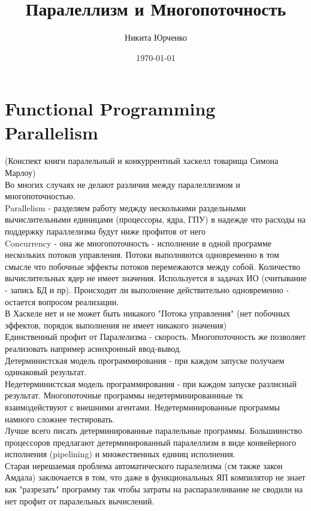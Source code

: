 \documentclass[12pt,a4paper]{article}
\date{\today}
\author{Никита Юрченко}
\title{Паралеллизм и Многопоточность}
\begin{document}
\maketitle
\newpage
{}  

\section{Functional Programming Parallelism}
(Конспект книги паралельный и конкуррентный хаскелл товарища Симона Марлоу)\\
Во многих случаях не делают различия между паралеллизмом и многопоточностью.\\
Parallelism - разделяем работу меджду несколькими раздельными вычислительными единицами (процессоры, ядра, ГПУ) в надежде что расходы на поддержку параллелизма будут ниже профитов от него\\
Concurrency - она же многопоточность - исполнение в одной программе нескольких потоков управления. Потоки выполняются одновременно в том смысле что побочные эффекты потоков перемежаются между собой. Количество вычислительных ядер не имеет значения. Используется в задачах ИО (считывание - запись БД и пр). Происходит ли выполнение действительно одновременно - остается вопросом реализации.\\
В Хаскеле нет и не может быть никакого "Потока управления" (нет побочных эффектов, порядок выполнения не имеет никакого значения)\\
Единственный профит от Паралелизма - скорость. Многопоточность же позволяет реализовать например асинхронный ввод-вывод. \\
Детерминистская модель программирования - при каждом запуске получаем одинаковый результат. \\
Недетерминистская модель программирования - при каждом запуске разлисный результат. Многопоточные программы недетерминированнные тк взаимодействуют с внешними агентами. Недетерминированные программы намного сложнее тестировать.\\
Лучше всего писать детерминированные паралельные программы. Большиинство процессоров предлагают детерминированный паралеллизм в виде конвейерного исполнения (pipelining) и множественных единиц исполнения. \\
Старая нерешаемая проблема автоматического паралелизма (см также закон Амдала) заключается в том, что даже в функциональных ЯП компилятор не знает как "разрезать" программу так чтобы затраты на распаралеливание не сводили на нет профит от паралельных вычислений.\\
\end{document}
